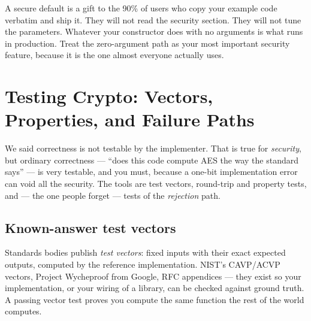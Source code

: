 \begin{intuitionbox}
A secure default is a gift to the 90\% of users who copy your example code verbatim
and ship it. They will not read the security section. They will not tune the
parameters. Whatever your constructor does with no arguments is what runs in
production. Treat the zero-argument path as your most important security feature,
because it is the one almost everyone actually uses.
\end{intuitionbox}

\section{Testing Crypto: Vectors, Properties, and Failure Paths}
\label{ch39:testing}

We said correctness is not testable by the implementer. That is true for
\emph{security}, but ordinary correctness --- ``does this code compute AES the way
the standard says'' --- is very testable, and you must, because a one-bit
implementation error can void all the security. The tools are test vectors,
round-trip and property tests, and --- the one people forget --- tests of the
\emph{rejection} path.

\subsection{Known-answer test vectors}

Standards bodies publish \emph{test vectors}: fixed inputs with their exact
expected outputs, computed by the reference implementation. NIST's CAVP/ACVP
vectors, Project Wycheproof from Google, RFC appendices --- they exist so your
implementation, or your wiring of a library, can be checked against ground truth.
A passing vector test proves you compute the same function the rest of the world
computes.

